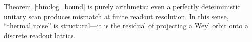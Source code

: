 \begin{remark}
Theorem~\ref{thm:log_bound} is purely arithmetic: even a perfectly deterministic unitary scan produces mismatch at finite readout resolution. In this sense, ``thermal noise'' is structural---it is the residual of projecting a Weyl orbit onto a discrete readout lattice.
\end{remark}


